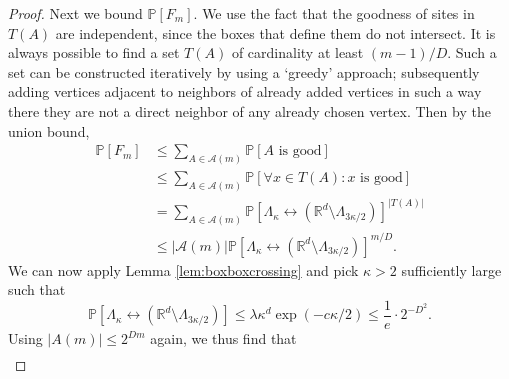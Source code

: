 \documentclass[a4paper,12pt]{scrartcl}
\renewcommand{\P}{\mathbb{P}}
\theoremstyle{definition}
\theoremstyle{remark}
\begin{document}
\begin{proof}
    Next we bound $\P[F_m]$. We use the fact that the goodness of sites in $T(A)$ are independent, since the boxes that define them do not intersect.
    It is always possible to find a set $T(A)$ of cardinality at least $(m-1)/D$. Such a set can be constructed iteratively by using a `greedy' approach; subsequently adding vertices adjacent to neighbors of already added vertices in such a way there they are not a direct neighbor of any already chosen vertex. Then by the union bound,
    \begin{align*}
      \P[F_m]
      & \leq
      \sum_{A\in\mathcal A(m)}
      \P[A\text{ is good}  ]                                               \\
      & \leq
      \sum_{A\in\mathcal A(m)}
      \P[\forall x\in T(A): x\text{ is good}]                             \\
      & =
      \sum_{A\in \mathcal A(m)}
      \P[\Lambda_{\kappa} \leftrightarrow (\mathbb R^d \setminus
      \Lambda_{3\kappa/2})]^{|T(A)|} \\
      & \leq
      |\mathcal A(m)| \P[\Lambda_\kappa \leftrightarrow
      (\mathbb R^d \setminus \Lambda_{3\kappa/2})]^{m/D}.
    \end{align*}
    We can now apply Lemma \ref{lem:boxboxcrossing} and pick $\kappa>2$ sufficiently large such that
    $$
    \P[\Lambda_{\kappa}\leftrightarrow (\mathbb R^d \setminus
    \Lambda_{3\kappa/2})]
    \leq
    \lambda \kappa^d \exp(-c\kappa/2)
    \leq
    \frac1e\cdot 2^{-D^2}.
    $$
    Using $|A(m)| \leq 2^{Dm}$ again, we thus
    find that
    \begin{equation}\label{eq:exp_bound_eq2}
      \begin{aligned}

\end{aligned}
\end{equation}
\end{proof}
\end{document}
